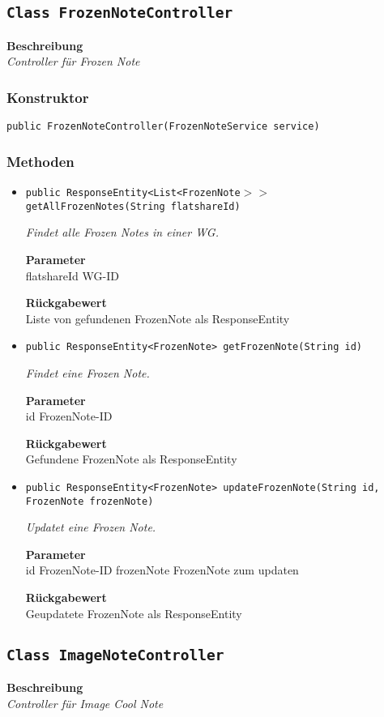     \subsection{\texttt{Class FrozenNoteController}}
    \textbf{Beschreibung} \\
    \textit{Controller für Frozen Note}
    \subsubsection{Konstruktor}
    \texttt{public FrozenNoteController(FrozenNoteService service)}
    \subsubsection{Methoden}
    \begin{itemize}
    	\item{\texttt{public ResponseEntity<List<FrozenNote$>>$ getAllFrozenNotes(String flatshareId)}}
    	
    	\textit{Findet alle Frozen Notes in einer WG.}
    	
    	\textbf{Parameter} \\
    	flatshareId WG-ID
    	
    	\textbf{Rückgabewert} \\
    	Liste von gefundenen FrozenNote als ResponseEntity        \item{\texttt{public ResponseEntity<FrozenNote> getFrozenNote(String id)}}
    	
    	\textit{Findet eine Frozen Note.}
    	
    	\textbf{Parameter} \\
    	id FrozenNote-ID
    	
    	\textbf{Rückgabewert} \\
    	Gefundene FrozenNote als ResponseEntity        \item{\texttt{public ResponseEntity<FrozenNote> updateFrozenNote(String id, FrozenNote frozenNote)}}
    	
    	\textit{Updatet eine Frozen Note.}
    	
    	\textbf{Parameter} \\
    	id FrozenNote-ID
    	frozenNote FrozenNote zum updaten
    	
    	\textbf{Rückgabewert} \\
    	Geupdatete FrozenNote als ResponseEntity
    \end{itemize}
    \subsection{\texttt{Class ImageNoteController}}
    \textbf{Beschreibung} \\
    \textit{Controller für Image Cool Note}
